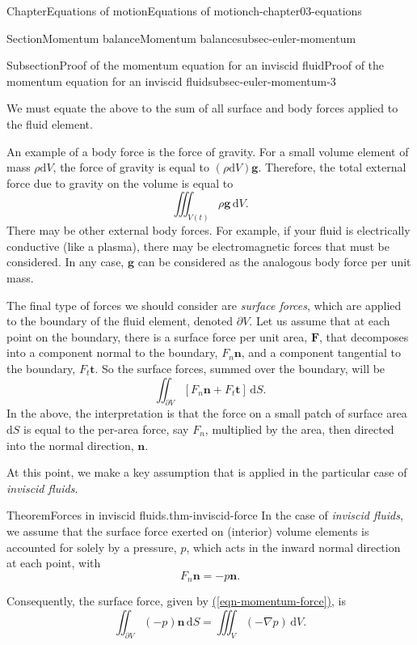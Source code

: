 \documentclass[oneside,10pt,]{book}
\newcommand{\xreffont}{\relax}
\numberwithin{equation}{section}
\newcommand{\de}{\mathrm{d}}
\newcommand{\bn}{\boldsymbol{n}}
\newcommand{\bt}{\boldsymbol{t}}
\newcommand{\bg}{\boldsymbol{g}}
\newcommand{\bF}{\boldsymbol{F}}
\renewcommand{\bt}{\boldsymbol{t}}
\begin{document}
\begin{chapterptx}{Chapter}{Equations of motion}{}{Equations of motion}{}{}{ch-chapter03-equations}
\begin{sectionptx}{Section}{Momentum balance}{}{Momentum balance}{}{}{subsec-euler-momentum}
\begin{subsectionptx}{Subsection}{Proof of the momentum equation for an inviscid fluid}{}{Proof of the momentum equation for an inviscid fluid}{}{}{subsec-euler-momentum-3}
\par
We must equate the above to the sum of all surface and body forces applied to the fluid element.%
\par
An example of a body force is the force of gravity. For a small volume element of mass \(\rho
\de{V}\), the force of gravity is equal to \((\rho \de{V})\bg\). Therefore, the total external force due to gravity on the volume is equal to%
\begin{equation}
\iiint_{V(t)} \rho \bg \, \de{V}.\label{eqn-momentum2}
\end{equation}
There may be other external body forces. For example, if your fluid is electrically conductive (like a plasma), there may be electromagnetic forces that must be considered. In any case, \(\bg\) can be considered as the analogous body force per unit mass.%
\par
The final type of forces we should consider are \emph{surface forces}, which are applied to the boundary of the fluid element, denoted \(\partial V\). Let us assume that at each point on the boundary, there is a surface force per unit area, \(\bF\), that decomposes into a component normal to the boundary, \(F_n \bn\), and a component tangential to the boundary, \(F_t \bt\). So the surface forces, summed over the boundary, will be%
\begin{equation}
\iint_{\partial V} \left[ F_n \bn + F_t \bt\right] \, \de{S}.\label{eqn-momentum-force}
\end{equation}
In the above, the interpretation is that the force on a small patch of surface area \(\de{S}\) is equal to the per-area force, say \(F_n\), multiplied by the area, then directed into the normal direction, \(\bn\).%
\par
At this point, we make a key assumption that is applied in the particular case of \emph{inviscid fluids}.%
\begin{theorem}{Theorem}{Forces in inviscid fluids.}{}{thm-inviscid-force}%
In the case of \emph{inviscid fluids}, we assume that the surface force exerted on (interior) volume elements is accounted for solely by a pressure, \(p\), which acts in the inward normal direction at each point, with%
\begin{equation*}
F_n \bn = -p \bn.
\end{equation*}
%
\par
Consequently, the surface force, given by \hyperref[eqn-momentum-force]{({\xreffont\ref{eqn-momentum-force}})}, is%
\begin{equation}
\iint_{\partial V} (-p) \bn \, \de{S} = \iiint_V (-\nabla p) \, \de{V}.\label{eqn-momentum-pressure}

\end{equation}
\end{theorem}
\end{subsectionptx}
\end{sectionptx}
\end{chapterptx}
\end{document}
